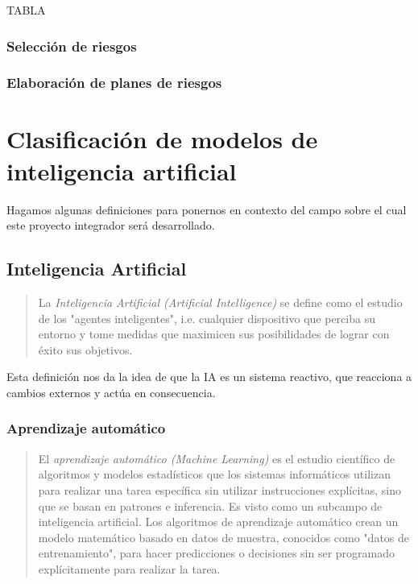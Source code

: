 \documentclass[a4paper,12pt]{article}
\begin{document}
TABLA

\subsubsection{Selección de riesgos}


\subsubsection{Elaboración de planes de riesgos}

\clearpage

\section{Clasificación de modelos de inteligencia artificial}

Hagamos algunas definiciones para ponernos en contexto del campo sobre el cual este proyecto integrador será desarrollado.

\subsection{Inteligencia Artificial}

\begin{quote}
	La \textit{Inteligencia Artificial (Artificial Intelligence)} se define como el estudio de los "agentes inteligentes", i.e. cualquier dispositivo que perciba su entorno y tome medidas que maximicen sus posibilidades de lograr con éxito sus objetivos.
		  
	\hfill \citet{poole1998}
\end{quote}

Esta definición nos da la idea de que la IA es un sistema reactivo, que reacciona a cambios externos y actúa en consecuencia.

\subsubsection{Aprendizaje automático} \label{machinelearning}

\begin{quote}
	El \textit{aprendizaje automático (Machine Learning)} es el estudio científico de algoritmos y modelos estadísticos que los sistemas informáticos utilizan para realizar una tarea específica sin utilizar instrucciones explícitas, sino que se basan en patrones e inferencia. Es visto como un subcampo de inteligencia artificial. Los algoritmos de aprendizaje automático crean un modelo matemático basado en datos de muestra, conocidos como "datos de entrenamiento", para hacer predicciones o decisiones sin ser programado explícitamente para realizar la tarea.
		  
	\hfill \citet{bishop2006pattern}
\end{quote}
\end{document}

